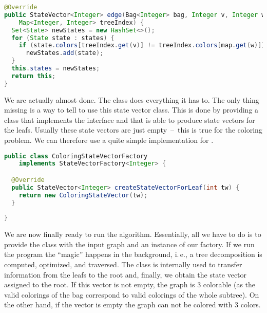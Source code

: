 \documentclass[a4paper, ukenglish, twoside, openright]{jdrasilmanual}
\begin{document}
\begin{lstlisting}[language=Java]
@Override
public StateVector<Integer> edge(Bag<Integer> bag, Integer v, Integer w,
    Map<Integer, Integer> treeIndex) {
  Set<State> newStates = new HashSet<>();
  for (State state : states) {
    if (state.colors[treeIndex.get(v)] != treeIndex.colors[map.get(w)])
      newStates.add(state);
  }
  this.states = newStates;
  return this;
}
\end{lstlisting}

We are actually almost done. The class 
does everything it has to. The only thing missing is a way to tell
\Jdrasil{} to use this state vector class. This is done by providing a
class that implements the  interface and
that is able to produce state vectors for the leafs. Usually these
state vectors are just empty~--~this is true for the coloring
problem. We can therefore use a quite simple implementation for
.

\begin{lstlisting}[language=Java]
public class ColoringStateVectorFactory
    implements StateVectorFactory<Integer> {

  @Override
  public StateVector<Integer> createStateVectorForLeaf(int tw) {
    return new ColoringStateVector(tw);
  }
  
}
\end{lstlisting}

We are now finally ready to run the algorithm. Essentially, all we have to do
is to provide
the  class with the
input graph and an instance of our factory. If we run the program the
``magic'' happens in the background, i.\,e., a tree decomposition is
computed, optimized, and traversed. The 
class is internally used to transfer information from the leafs to the
root and, finally, we obtain the state vector assigned to the root. If
this vector is not empty, the graph is 3 colorable (as the valid
colorings of the bag correspond to valid colorings of the whole
subtree). On the other hand, if the vector is empty the graph can not
be colored with 3 colors.
\end{document}
